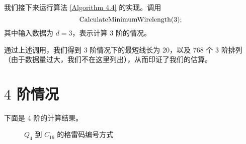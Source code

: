 我们接下来运行算法 \ref{Algorithm 4.4} 的实现。调用
\begin{equation*}
\textnormal{CalculateMinimumWirelength}(3);
\end{equation*}
其中输入数据为 $d = 3$，表示计算 $3$ 阶的情况。

通过上述调用，我们得到 $3$ 阶情况下的最短线长为 $20$，以及 $768$ 个 $3$ 阶排列
（由于数据量过大，我们不在这里列出），从而印证了我们的估算。

\section{$4$ 阶情况}
\label{Section 5.3}

下面是 $4$ 阶的计算结果。

\begin{figure}[h!]
	\centering
	
	\caption{$Q_4$ 到 $C_{16}$ 的格雷码编号方式}
	\label{Figure 5-1}
\end{figure}
